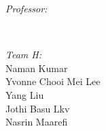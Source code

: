 \begin{titlepage}
\begin{minipage}{0.5\textwidth}
\begin{flushleft} \large
\emph{Professor:}\\
\@author %
\end{flushleft}
\end{minipage}
~
\begin{minipage}{0.4\textwidth}
\emph{Team H:} \\[1.2em] %
Naman Kumar\\
Yvonne Chooi Mei Lee\\ 
Yang Liu\\
Jothi Basu Lkv\\
Nasrin Maarefi\\[1.2em]

\end{minipage}\\[3cm]
\makeatother




\vfill %

\end{titlepage}